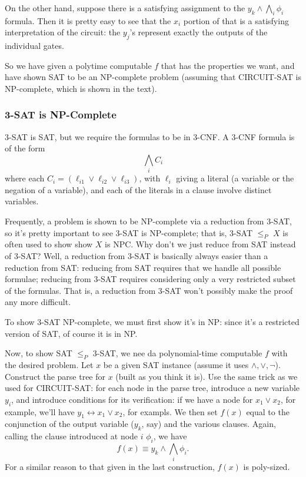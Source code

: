 \documentclass{article}
\begin{document}
On the other hand, suppose there is a satisfying assignment to the
$
y_k \wedge \bigwedge_i \phi_i
$
formula. Then it is pretty easy to see that the $x_i$ portion of that
is a satisfying interpretation of the circuit: the $y_j$'s represent exactly
the outputs of the individual gates.

So we have given a polytime computable $f$ that has the properties we want,
and have shown SAT to be an NP-complete problem (assuming that CIRCUIT-SAT
is NP-complete, which is shown in the text).


\subsubsection{3-SAT is NP-Complete}

3-SAT is SAT, but we require the formulas to be in 3-CNF.
A 3-CNF formula is of the form
$$
\bigwedge_i C_i
$$
where each $C_i = (\ell_{i1} \vee \ell_{i2} \vee \ell_{i3})$, with
$\ell_i$ giving a literal (a variable or the negation of a variable), and
each of the literals in a clause involve distinct variables.

Frequently, a problem is shown to be NP-complete via a reduction from 3-SAT,
so it's pretty important to see 3-SAT is NP-complete; that is, 3-SAT $\leq_P$
$X$ is often used to show show $X$ is NPC.
Why don't we just reduce from SAT instead of 3-SAT?
Well, a reduction from 3-SAT is basically always easier than a reduction
from SAT: reducing from SAT requires that we handle all possible formulae;
reducing from 3-SAT requires considering only a very restricted subset
of the formulas.
That is, a reduction from 3-SAT won't possibly make the proof any more 
difficult.

To show 3-SAT NP-complete, we must first show it's in NP: since it's a 
restricted version of SAT, of course it is in NP.

Now, to show SAT $\leq_P$ 3-SAT, we nee da polynomial-time computable
$f$ with the desired problem.
Let $x$ be a given SAT instance (assume it uses $\wedge,\vee,\neg$).
Construct the parse tree for $x$ (built as you think it is).
Use the same trick as we used for CIRCUIT-SAT: for each node in the parse
tree, introduce a new variable $y_i$, and introduce conditions for its
verification: if we have a node for $x_1\vee x_2$, for example, we'll have
$y_1\leftrightarrow x_1\vee x_2$, for exampls.
We then set $f(x)$ equal to the conjunction of the output variable ($y_k$, say)
and the various clauses.
Again, calling the clause introduced at node $i$ $\phi_i$, we have
$$
f(x) \equiv y_k \wedge
\bigwedge_i \phi_i.
$$
For a similar reason to that given in the last construction, $f(x)$ is
poly-sized.
\end{document}
